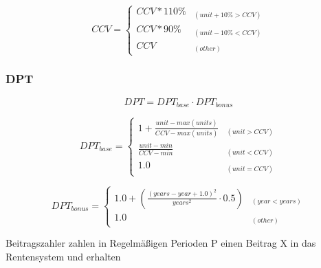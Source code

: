 \begin{equation*}
CCV = \begin{cases} 
CCV * 110\% & _{(unit+10\% > CCV)} \\
CCV * 90\% & _{(unit-10\% < CCV)} \\
CCV & _{(other)}
\end{cases}
\end{equation*}

\subsubsection*{DPT}

\begin{equation*}
DPT = DPT_{base} \cdot DPT_{bonus}
\end{equation*}

\begin{equation*}
DPT_{base} = \begin{cases} 
1 + \frac{unit-max(units)} {CCV - max(units)} 
  & _{(unit > CCV)} \\
\frac{unit - min} {CCV - min} 
  & _{(unit < CCV)} \\
1.0 & _{(unit = CCV)}
\end{cases}
\end{equation*}

\begin{equation*}
DPT_{bonus} = \begin{cases} 
1.0 + (\frac{(years - year + 1.0)^2}
      {years^2} \cdot 0.5) & _{(year < years)} \\
1.0 & _{(other)} 
\end{cases}
\end{equation*}








Beitragszahler zahlen in Regelmäßigen Perioden P einen Beitrag X in das Rentensystem und erhalten 


